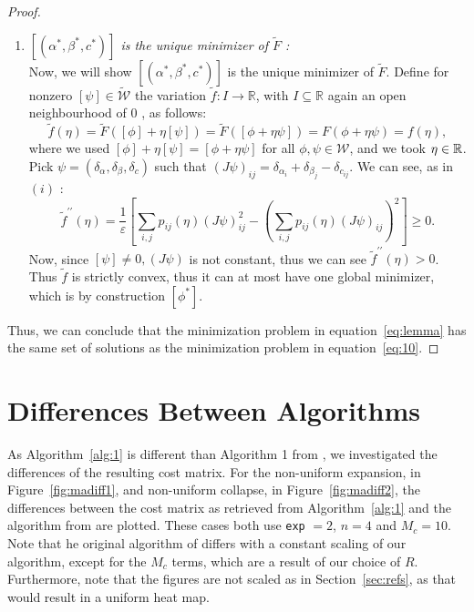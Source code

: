\begin{proof}
\begin{enumerate}[label=(\roman*)]
		\item  \textit{$\left[\left(\alpha^{*}, \beta^{*}, c^{*}\right)\right]$ is the unique minimizer of $\widetilde{F}$ :}\\
		Now, we will show $\left[\left(\alpha^{*}, \beta^{*}, c^{*}\right)\right]$ is the unique minimizer of $\widetilde{F}$. Define for nonzero $[\psi] \in \widetilde{\mathcal{W}}$ the variation $\widetilde{f}: I \rightarrow \mathbb{R}$, with $I \subseteq \mathbb{R}$ again an open neighbourhood of 0 , as follows:
		\[ \widetilde{f}(\eta)=\widetilde{F}([\phi]+\eta[\psi])=\widetilde{F}([\phi+\eta \psi])=F(\phi+\eta \psi) = f(\eta), \]
		where we used $[\phi]+\eta[\psi]=[\phi+\eta \psi]$ for all $\phi, \psi \in \mathcal{W}$, and we took $\eta \in \mathbb{R}$. Pick $\psi=\left(\delta_{\alpha}, \delta_{\beta}, \delta_{c}\right)$ such that $(J \psi)_{i j}=\delta_{\alpha_{i}}+\delta_{\beta_{j}}-\delta_{c_{i j}}$. We can see, as in $(i)$ : 
		\[\widetilde{f}^{\prime \prime}(\eta)=\frac{1}{\varepsilon}\left[\sum_{i, j} p_{i j}(\eta)(J \psi)_{i j}^{2}-\left(\sum_{i, j} p_{i j}(\eta)(J \psi)_{i j}\right)^{2}\right] \geq 0.\]
		Now, since $[\psi] \neq 0,(J \psi)$ is not constant, thus we can see $\widetilde{f}^{\prime \prime}(\eta)>0$. Thus $\widetilde{f}$ is strictly convex, thus it can at most have one global minimizer, which is by construction $\left[\phi^{*}\right]$.\par 
	\end{enumerate} 
	Thus, we can conclude that the minimization problem in equation~\eqref{eq:lemma} has the same set of solutions as the minimization problem in equation~\eqref{eq:10}.
\end{proof}

\chapter{Differences Between Algorithms}
\label{sec:differencesma}
As Algorithm~\ref{alg:1} is different than Algorithm 1 from \citet{ma2021}, we investigated the differences of the resulting cost matrix. For the non-uniform expansion, in Figure~\ref{fig:madiff1}, and non-uniform collapse, in Figure~\ref{fig:madiff2}, the differences between the cost matrix as retrieved from Algorithm~\ref{alg:1} and the algorithm from \citet{ma2021} are plotted. These cases both use \lstinline|exp| $= 2$, $n=4$ and $M_c = 10$. Note that he original algorithm of \citet{ma2021} differs with a constant scaling of our algorithm, except for the $M_c$ terms, which are a result of our choice of $R$. Furthermore, note that the figures are not scaled as in Section~\ref{sec:refs}, as that would result in a uniform heat map. 

